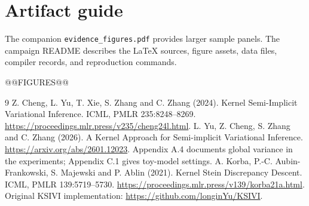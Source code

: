 \documentclass[11pt,a4paper]{article}
\numberwithin{equation}{section}
\begin{document}
\section{Artifact guide}
{\small
The companion \texttt{evidence\_figures.pdf} provides larger sample panels.
The campaign README describes the LaTeX sources, figure assets, data files,
compiler records, and reproduction commands.\par}

\clearpage
@@FIGURES@@

\begin{thebibliography}{9}
 Z. Cheng, L. Yu, T. Xie, S. Zhang and C. Zhang (2024).
Kernel Semi-Implicit Variational Inference. ICML, PMLR 235:8248--8269.
\url{https://proceedings.mlr.press/v235/cheng24l.html}.
 L. Yu, Z. Cheng, S. Zhang and C. Zhang (2026).
A Kernel Approach for Semi-implicit Variational Inference.
\url{https://arxiv.org/abs/2601.12023}. Appendix A.4 documents global
variance in the experiments; Appendix C.1 gives toy-model settings.
 A. Korba, P.-C. Aubin-Frankowski, S. Majewski and P. Ablin
(2021). Kernel Stein Discrepancy Descent. ICML, PMLR 139:5719--5730.
\url{https://proceedings.mlr.press/v139/korba21a.html}.
 Original KSIVI implementation:
\url{https://github.com/longinYu/KSIVI}.
\end{thebibliography}
\end{document}
